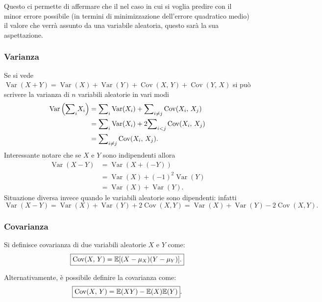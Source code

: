 \noindent Questo ci permette di affermare che il nel caso in cui si voglia predire con il minor errore possibile (in termini di minimizzazione dell'errore quadratico medio) il valore che verrà assunto da una variabile aleatoria, questo sarà la sua aspettazione.

\subsubsection{Varianza}
Se si vede $\operatorname{Var}(X+Y) = \operatorname{Var}(X) + \operatorname{Var}(Y) + \operatorname{Cov}(X,\,Y) + \operatorname{Cov}(Y,\,X)$ si può scrivere la varianza di $n$ variabili aleatorie in vari modi
\begin{align*}
\operatorname{Var}\left({\sum}_i X_i\right) &= {\sum}_i\operatorname{Var}(X_i) + {\sum}_{i \neq j} \operatorname{Cov}(X_i, \, X_j) 
\\ &= {\sum}_i\operatorname{Var}(X_i) + 2 {\sum}_{i < j} \operatorname{Cov}(X_i, \, X_j) \\ 
&= {\sum}_{i \neq j} \operatorname{Cov}(X_i, \, X_j).
\end{align*}
Interessante notare che se $X$ e $Y$ sono indipendenti allora \begin{align*}
    \operatorname{Var}(X-Y) &= \operatorname{Var}(X + (-Y)) \\ 
    &= \operatorname{Var}(X) + (-1)^2 \operatorname{Var}(Y) \\
    &= \operatorname{Var}(X) + \operatorname{Var}(Y).
\end{align*}
Situazione diversa invece quando le variabili aleatorie sono dipendenti: infatti
$$
\operatorname{Var}(X-Y) = \operatorname{Var}(X) + \operatorname{Var}(Y) + 2\operatorname{Cov}(X, Y) = \operatorname{Var}(X) + \operatorname{Var}(Y) - 2\operatorname{Cov}(X, Y).
$$

\subsubsection{Covarianza}
Si definisce covarianza di due variabili aleatorie $X$ e $Y$ come: \[
\boxed{
\operatorname{Cov}(X, \, Y) = \mathbb{E}[(X-\mu_X)(Y-\mu_Y)].
}
\]

\noindent Alternativamente, è possibile definire la covarianza come: \[
\boxed{\operatorname{Cov}(X, \, Y) = \mathbb{E}(X Y) - \mathbb{E}(X)\mathbb{E}(Y)}.
\]

